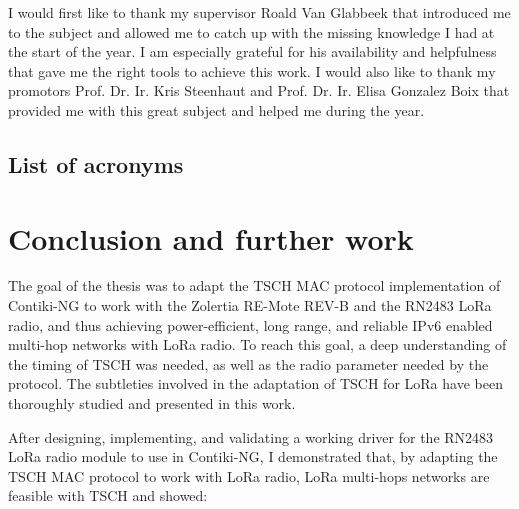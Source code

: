 \documentclass[11pt]{report}
\begin{document}
I would first like to thank my supervisor Roald Van Glabbeek that introduced me
to the subject and allowed me to catch up with the missing knowledge I had at
the start of the year.
I am especially grateful for his availability and helpfulness that gave me the
right tools to achieve this work.
I would also like to thank my promotors Prof. Dr. Ir. Kris Steenhaut and Prof.
Dr. Ir. Elisa Gonzalez Boix that provided me with this great subject and helped me
during the year.


\newpage

\tableofcontents

\newpage

\listoffigures

\newpage

\section*{List of acronyms}



\newpage










\chapter{Conclusion and further work\label{section:conclusion}}

The goal of the thesis was to adapt the TSCH MAC protocol implementation of Contiki-NG
to work with the Zolertia RE-Mote REV-B and the RN2483 LoRa radio,
and thus achieving power-efficient, long range, and reliable IPv6 enabled
multi-hop networks with LoRa radio.
To reach this goal, a deep understanding of the timing of TSCH was needed, as
well as the radio parameter needed by the protocol.
The subtleties involved in the adaptation of TSCH for LoRa have been
thoroughly studied and presented in this work.

After designing, implementing, and validating a working driver for the RN2483 LoRa radio module to use
in Contiki-NG, I demonstrated that, by adapting the TSCH MAC protocol to work
with LoRa radio, LoRa multi-hops networks are feasible with TSCH and showed:
\end{document}
